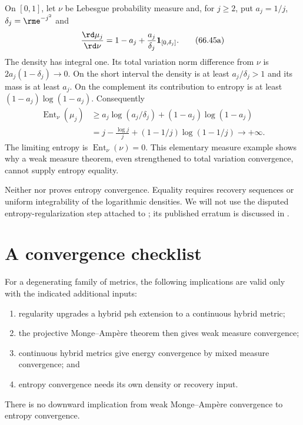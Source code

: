 \begin{example}
\label{ex:hybrid-entropy-concentration}
On $[0,1]$, let $\nu$ be Lebesgue probability measure and, for $j\geq2$, put $a_j=1/j$, $\delta_j=\rme^{-j^2}$ and
\[
 \frac{\rd\mu_j}{\rd\nu}
   =1-a_j+\frac{a_j}{\delta_j}\mathbf1_{[0,\delta_j]}.
\tag{66.45a}\label{eq:hybrid-entropy-spike}
\]
The density has integral one. Its total variation norm difference from $\nu$ is $2a_j(1-\delta_j)\to0$. On the short interval the density is at least $a_j/\delta_j>1$ and its mass is at least $a_j$. On the complement its contribution to entropy is at least $(1-a_j)\log(1-a_j)$. Consequently
\[
\begin{aligned}
 \operatorname{Ent}_\nu(\mu_j)
 &\geq a_j\log(a_j/\delta_j)+(1-a_j)\log(1-a_j)\\
 &=j-\frac{\log j}{j}+(1-1/j)\log(1-1/j)\longrightarrow+\infty.
\end{aligned}
\tag{66.45b}\label{eq:hybrid-entropy-spike-bound}
\]
The limiting entropy is $\operatorname{Ent}_\nu(\nu)=0$. This elementary measure example shows why a weak measure theorem, even strengthened to total variation convergence, cannot supply entropy equality.
\end{example}

\begin{remark}
\label{fire:hybrid-entropy}
Neither  nor  proves entropy convergence. Equality requires recovery sequences or uniform integrability of the logarithmic densities. We will not use the disputed entropy-regularization step attached to \cite[Theorem~5.6]{BHJ19}; its published erratum is discussed in .
\end{remark}

\section{A convergence checklist}
\label{sec:hybrid-checklist}

\begin{proposition}\label{prop:hybrid-four-layers}
For a degenerating family of metrics, the following implications are valid only with the indicated additional inputs:
\begin{enumerate}
\item regularity upgrades a hybrid psh extension to a continuous
hybrid metric;
\item the projective Monge--Amp\`ere theorem then gives weak measure
convergence;
\item continuous hybrid metrics give energy convergence by mixed measure
convergence; and
\item entropy convergence needs its own density or recovery input.
\end{enumerate}
There is no downward implication from weak Monge--Amp\`ere convergence to entropy convergence.
\end{proposition}

